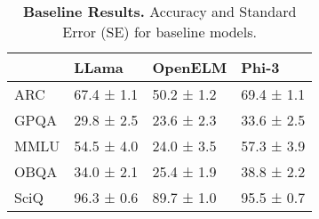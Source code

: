 
\begin{table}[H]
\centering
\caption{\textbf{Baseline Results.} Accuracy and Standard Error (SE) for baseline models.}
\label{tab:baseline-benchmark}
\begin{tabular}{llll}
\toprule
 & LLama & OpenELM & Phi-3 \\
\midrule
ARC & 67.4 ± 1.1 & 50.2 ± 1.2 & 69.4 ± 1.1 \\
GPQA & 29.8 ± 2.5 & 23.6 ± 2.3 & 33.6 ± 2.5 \\
MMLU & 54.5 ± 4.0 & 24.0 ± 3.5 & 57.3 ± 3.9 \\
OBQA & 34.0 ± 2.1 & 25.4 ± 1.9 & 38.8 ± 2.2 \\
SciQ & 96.3 ± 0.6 & 89.7 ± 1.0 & 95.5 ± 0.7 \\
\bottomrule
\end{tabular}
\end{table}
